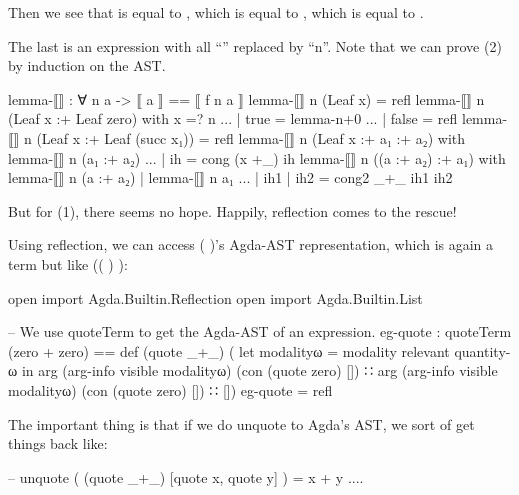 \documentclass{article}
\begin{document}
Then we see that  is equal to  , which is equal to   \AgdaFunction{[\AgdaUnderscore{}]} , which is equal to     \AgdaFunction{[\AgdaUnderscore{}]} .

The last is an expression with all ``'' replaced by ``n''. Note that we can prove (2) by induction on the AST.

\begin{code}
lemma-⟦⟧ : ∀ n a ->  ⟦ a ⟧ == ⟦ f n a ⟧
lemma-⟦⟧ n (Leaf x) = refl
lemma-⟦⟧ n (Leaf x :+ Leaf zero) with x =? n
... | true = lemma-n+0
... | false = refl
lemma-⟦⟧ n (Leaf x :+ Leaf (succ x₁)) = refl
lemma-⟦⟧ n (Leaf x :+ a₁ :+ a₂) with lemma-⟦⟧ n (a₁ :+ a₂)
... | ih = cong (x +_) ih
lemma-⟦⟧ n ((a :+ a₂) :+ a₁) with lemma-⟦⟧ n (a :+ a₂) | lemma-⟦⟧ n a₁
... | ih1 | ih2 = cong2 _+_ ih1 ih2
\end{code}

But for (1), there seems no hope. Happily, reflection comes to the rescue!

Using reflection, we can access \AgdaSymbol( \AgdaOperator{\AgdaFunction{+}} \AgdaSymbol)'s Agda-AST representation, which is again a term but like \AgdaSymbol(\AgdaSymbol( \AgdaFunction{\AgdaUnderscore{}+\AgdaUnderscore{}}\AgdaSymbol) \AgdaOperator{\AgdaFunction{[}}   \AgdaOperator{\AgdaInductiveConstructor{,}}   \AgdaOperator{\AgdaFunction{]}}\AgdaSymbol):

\begin{code}
open import Agda.Builtin.Reflection
open import Agda.Builtin.List

-- We use quoteTerm to get the Agda-AST of an expression.
eg-quote : quoteTerm (zero + zero) ==
  def (quote _+_)
      ( let modalityω = modality relevant quantity-ω in
        arg (arg-info visible modalityω) (con (quote zero) [])
      ∷ arg (arg-info visible modalityω) (con (quote zero) [])
      ∷ [])
eg-quote = refl
\end{code}

The important thing is that if we do unquote to Agda's AST, we sort of get things back like:

\begin{code}
-- unquote ( (quote _+_) [quote x, quote y] ) = x + y ....
\end{code}
\end{document}
